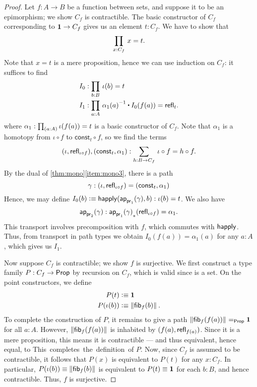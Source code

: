 \begin{proof}
Let $f:A\to B$ be a function between sets, and suppose it to be an epimorphism; we show $C_f$ is contractible.
The basic constructor of $C_f$ corresponding to
$\mathbf{1}\to C_f$ gives us an element $t:C_f$. We have to show that
\begin{equation*}
\prd{x:C_f} x= t.
\end{equation*}
Note that $x= t$ is a mere proposition, hence we can use induction on
$C_f$: it suffices to find
\begin{align*}
I_0 & : \prd{b:B} \iota(b)= t\\
I_1 & : \prd{a:A} \opp{\alpha_1(a)} \ct I_0(f(a))=\refl{t}.
\end{align*}
where $\alpha_1:\prd{a:A} \iota(f(a))= t$ is a basic constructor
of $C_f$. Note that $\alpha_1$ is a homotopy from $\iota\circ f$ to
$\mathsf{const}_t\circ f$, so we find the terms
\begin{equation*}
\pairr{\iota,\refl{\iota\circ f}},\pairr{\mathsf{const}_t,\alpha_1}:
\sm{h:B\to C_f} \iota\circ f = h\circ f.
\end{equation*}
By the dual of \autoref{thm:mono}\ref{item:mono3}, there is a path
\begin{equation*}
\gamma:{(\iota,\mathsf{refl}_{\iota\circ f})}={(\mathsf{const}_t,\alpha_1)}
\end{equation*}
Hence, we may define $I_0(b)\vcentcolon\equiv \mathsf{happly}(\mathsf{ap}_{\mathsf{pr}_{1}}(\gamma),b):\iota(b)=t$.
We also have
\[\mathsf{ap}_{\mathsf{pr}_{2}}(\gamma) : {\mathsf{ap}_{\mathsf{pr}_{1}}(\gamma)}_{*}\mathopen{}\left({\mathsf{refl}_{\iota\circ f}}\right)\mathclose{} = \alpha_1. \]
This transport involves precomposition with $f$, which commutes with $\mathsf{happly}$.
Thus, from transport in path types we obtain $I_0(f(a)) = \alpha_1(a)$ for any $a:A$, which gives us $I_1$.

Now suppose $C_f$ is contractible; we show $f$ is surjective.
We first construct a type family $P:C_f\to\mathsf{Prop}$ by recursion on $C_f$, which is valid since \prop is a set.
On the point constructors, we define
\begin{align*}
P(t) & \vcentcolon\equiv \mathbf{1}\\
P(\iota(b)) & \vcentcolon\equiv \left\Vert {\mathsf{fib}}_{f}(b)\right\Vert_{}.
\end{align*}
To complete the construction of $P$, it remains to give a path $\left\Vert {\mathsf{fib}}_{f}(f(a))\right\Vert_{} =_\mathsf{Prop} \mathbf{1}$ for all $a:A$.
However, $\left\Vert {\mathsf{fib}}_{f}(f(a))\right\Vert_{}$ is inhabited by $(f(a),\mathsf{refl}_{f(a)})$.
Since it is a mere proposition, this means it is contractible --- and thus equivalent, hence equal, to \unit.
This completes the definition of $P$.
Now, since $C_f$ is assumed to be contractible, it follows that $P(x)$ is equivalent to $P(t)$ for any $x:C_f$.
In particular, $P(\iota(b))\equiv \left\Vert {\mathsf{fib}}_{f}(b)\right\Vert_{}$ is equivalent to $P(t)\equiv \mathbf{1}$ for each $b:B$, and hence contractible.
Thus, $f$ is surjective.


\end{proof}
